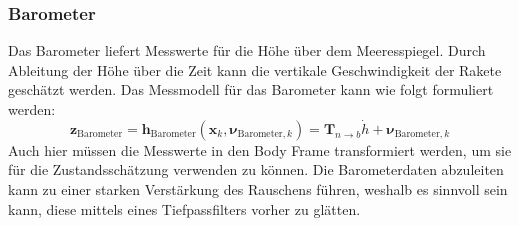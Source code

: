 \subsubsection{Barometer}
Das Barometer liefert Messwerte für die Höhe über dem Meeresspiegel. Durch Ableitung der Höhe über die Zeit kann die vertikale Geschwindigkeit der Rakete geschätzt werden. Das Messmodell für das Barometer kann wie folgt formuliert werden:
\begin{equation}
\mathbf{z}_{\mathrm{Barometer}} = \mathbf{h}_{\mathrm{Barometer}}(\mathbf{x}_k, \boldsymbol{\nu}_{\mathrm{Barometer},k}) = \mathbf{T}_{n \to b}\dot{h} + \boldsymbol{\nu}_{\mathrm{Barometer},k}
\end{equation}
Auch hier müssen die Messwerte in den Body Frame transformiert werden, um sie für die Zustandsschätzung verwenden zu können. Die Barometerdaten abzuleiten kann zu einer starken Verstärkung des Rauschens führen, weshalb es sinnvoll sein kann, diese mittels eines Tiefpassfilters vorher zu glätten.

